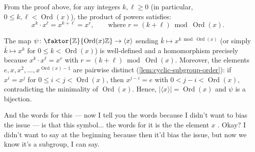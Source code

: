 \begin{content}
From the proof above, for any integers $k, \ell \ge 0$ (in particular, $0 \le k, \ell < \operatorname{Ord}(x)$), the product of powers satisfies:
\[
x^k \cdot x^\ell = x^{k+\ell} = x^r, \qquad \text{where } r = (k + \ell) \bmod \operatorname{Ord}(x).
\]


\begin{steps}
The map $\psi \colon \faktor{\mathbb{Z}}{\operatorname{Ord}(x)\mathbb{Z}} \to \langle x \rangle$ sending $\bar{k} \mapsto x^{k \bmod \operatorname{Ord}(x)}$ (or simply $\bar{k} \mapsto x^k$ for $0 \le k < \operatorname{Ord}(x)$) is well-defined and a homomorphism precisely because $x^k \cdot x^\ell = x^r$ with $r = (k+\ell) \bmod \operatorname{Ord}(x)$. Moreover, the elements $e, x, x^2, \dots, x^{\operatorname{Ord}(x)-1}$ are pairwise distinct (\cref{lem:cyclic-subgroup-order}): if $x^i = x^j$ for $0 \le i < j < \operatorname{Ord}(x)$, then $x^{j-i} = e$ with $0 < j - i < \operatorname{Ord}(x)$, contradicting the minimality of $\operatorname{Ord}(x)$. Hence, $|\langle x \rangle| = \operatorname{Ord}(x)$ and $\psi$ is a bijection.
\end{steps}
\end{content}

\begin{speech}[00:07:24 - 00:07:55]
And the words for this --- now I tell you the words because I didn't want to bias the issue --- is that this symbol... the words for it is the  the element $x$ . Okay? I didn't want to say at the beginning because then it'd bias the issue, but now we know it's a subgroup, I can say.
\end{speech}

\begin{content}
\end{content}

